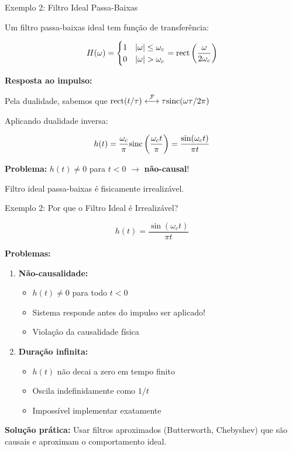 
\begin{frame}{Exemplo 2: Filtro Ideal Passa-Baixas}

Um filtro passa-baixas ideal tem função de transferência:

\[
H(\omega) = \begin{cases}
1 & |\omega| \leq \omega_c \\
0 & |\omega| > \omega_c
\end{cases} = \text{rect}\left(\frac{\omega}{2\omega_c}\right)
\]

\textbf{Resposta ao impulso:}

Pela dualidade, sabemos que $\text{rect}(t/\tau) \mathrel{\overset{\mathcal{F}}{\longleftrightarrow}} \tau\text{sinc}(\omega\tau/2\pi)$

Aplicando dualidade inversa:

\[
h(t) = \frac{\omega_c}{\pi} \text{sinc}\left(\frac{\omega_c t}{\pi}\right) = \frac{\sin(\omega_c t)}{\pi t}
\]

\textbf{Problema:} $h(t) \neq 0$ para $t < 0$ $\rightarrow$ \textbf{não-causal}!

Filtro ideal passa-baixas é fisicamente irrealizável.

\end{frame}


\begin{frame}{Exemplo 2: Por que o Filtro Ideal é Irrealizável?}

\[
h(t) = \frac{\sin(\omega_c t)}{\pi t}
\]

\textbf{Problemas:}

\begin{enumerate}
\item \textbf{Não-causalidade:}
   \begin{itemize}
   \item $h(t) \neq 0$ para todo $t < 0$
   \item Sistema responde antes do impulso ser aplicado!
   \item Violação da causalidade física
   \end{itemize}

\item \textbf{Duração infinita:}
   \begin{itemize}
   \item $h(t)$ não decai a zero em tempo finito
   \item Oscila indefinidamente como $1/t$
   \item Impossível implementar exatamente
   \end{itemize}
\end{enumerate}

\textbf{Solução prática:} Usar filtros aproximados (Butterworth, Chebyshev) que são causais e aproximam o comportamento ideal.

\end{frame}

